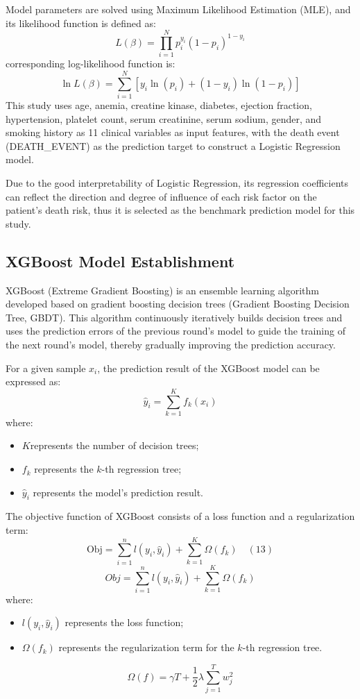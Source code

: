 \documentclass[11pt,a4paper]{article}
\begin{document}
Model parameters are solved using Maximum Likelihood Estimation (MLE), and its likelihood function is defined as:
\begin{equation}
L(\beta)
=
\prod_{i=1}^{N}
p_i^{y_i}
(1-p_i)^{1-y_i}
\end{equation}
corresponding log-likelihood function is:
\begin{equation}
\ln L(\beta)
=
\sum_{i=1}^{N}
\left[
y_i\ln(p_i)
+
(1-y_i)\ln(1-p_i)
\right]
\end{equation}
This study uses age, anemia, creatine kinase, diabetes, ejection fraction, hypertension, platelet count, serum creatinine, serum sodium, gender, and smoking history as 11 clinical variables as input features, with the death event (DEATH\_EVENT) as the prediction target to construct a Logistic Regression model.

Due to the good interpretability of Logistic Regression, its regression coefficients can reflect the direction and degree of influence of each risk factor on the patient's death risk, thus it is selected as the benchmark prediction model for this study.

\subsection{XGBoost Model Establishment}

XGBoost (Extreme Gradient Boosting) is an ensemble learning algorithm developed based on gradient boosting decision trees (Gradient Boosting Decision Tree, GBDT). This algorithm continuously iteratively builds decision trees and uses the prediction errors of the previous round's model to guide the training of the next round's model, thereby gradually improving the prediction accuracy.

For a given sample $x_i$, the prediction result of the XGBoost model can be expressed as:
\begin{equation}
\hat{y}_i
=
\sum_{k=1}^{K}
f_k(x_i)
\end{equation}
where:  
\begin{itemize}
\item $K$represents the number of decision trees;
\item $f_k$ represents the $k$-th regression tree;
\item $\hat{y}_i$ represents the model's prediction result. 
\end{itemize}
The objective function of XGBoost consists of a loss function and a regularization term:
$$\text{Obj} = \sum_{i=1}^{n}l(y_{i}, \hat{y}_{i}) + \sum_{k=1}^{K}\Omega(f_{k}) \quad (13)$$
\begin{equation}
Obj
=
\sum_{i=1}^{n}
l(y_i,\hat{y}_i)
+
\sum_{k=1}^{K}
\Omega(f_k)
\end{equation}
where:
\begin{itemize}
\item $l(y_i,\hat{y}_i)$ represents the loss function;
\item $\Omega(f_k)$ represents the regularization term for the $k$-th regression tree.
\end{itemize}
\begin{equation}
\Omega(f)
=
\gamma T
+
\frac{1}{2}\lambda
\sum_{j=1}^{T}
w_j^2
\end{equation}
\end{document}
